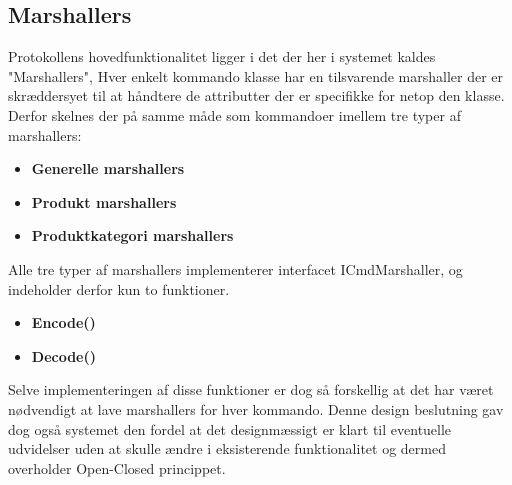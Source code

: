 \subsection{Marshallers} \label{MARSHALLER}

Protokollens hovedfunktionalitet ligger i det der her i systemet kaldes "Marshallers", Hver enkelt kommando klasse har en tilsvarende marshaller der er skræddersyet til at håndtere de attributter der er specifikke for netop den klasse. Derfor skelnes der på samme måde som kommandoer imellem tre typer af marshallers:

\begin{itemize}
	\item \textbf{Generelle marshallers} 
	\item \textbf{Produkt marshallers} 
	\item \textbf{Produktkategori marshallers}
\end{itemize}

Alle tre typer af marshallers implementerer interfacet ICmdMarshaller, og indeholder derfor kun to funktioner.

\begin{itemize}
	\item \textbf{Encode()} 
	\item \textbf{Decode()} 
\end{itemize}

Selve implementeringen af disse funktioner er dog så forskellig at det har været nødvendigt at lave marshallers for hver kommando. Denne design beslutning gav dog også systemet den fordel at det designmæssigt er klart til eventuelle udvidelser uden at skulle ændre i eksisterende funktionalitet og dermed overholder Open-Closed princippet.


